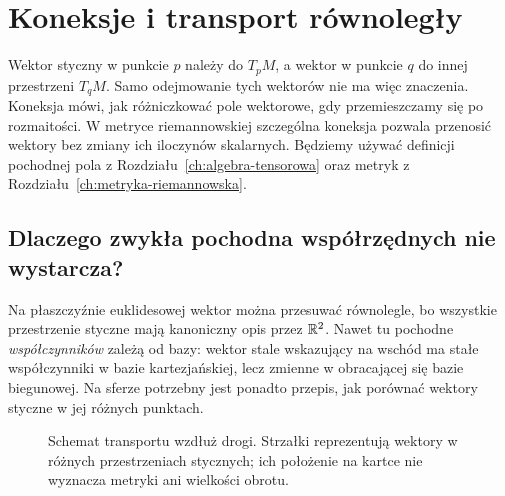 \chapter{Koneksje i transport równoległy}
\label{ch:koneksje}

Wektor styczny w punkcie $p$ należy do $T_pM$, a wektor
w punkcie $q$ do innej przestrzeni $T_qM$. Samo odejmowanie
tych wektorów nie ma więc znaczenia. Koneksja mówi,
jak różniczkować pole wektorowe, gdy przemieszczamy się
po rozmaitości. W metryce riemannowskiej szczególna
koneksja pozwala przenosić wektory bez zmiany ich
iloczynów skalarnych. Będziemy używać definicji
pochodnej pola z Rozdziału~\ref{ch:algebra-tensorowa}
oraz metryk z Rozdziału~\ref{ch:metryka-riemannowska}.

\section{Dlaczego zwykła pochodna współrzędnych nie wystarcza?}
\label{sec:koneksja-motywacja}

Na płaszczyźnie euklidesowej wektor można przesuwać
równolegle, bo wszystkie przestrzenie styczne mają
kanoniczny opis przez $\mathbb{R}^2$. Nawet tu pochodne
\emph{współczynników} zależą od bazy: wektor stale
wskazujący na wschód ma stałe współczynniki w bazie
kartezjańskiej, lecz zmienne w obracającej się bazie
biegunowej. Na sferze potrzebny jest ponadto przepis,
jak porównać wektory styczne w jej różnych punktach.

\begin{figure}[htbp]
\centering
{}
\caption{Schemat transportu wzdłuż drogi. Strzałki reprezentują wektory w różnych przestrzeniach stycznych; ich położenie na kartce nie wyznacza metryki ani wielkości obrotu.}
\label{fig:koneksja-transport-idea}
\end{figure}

